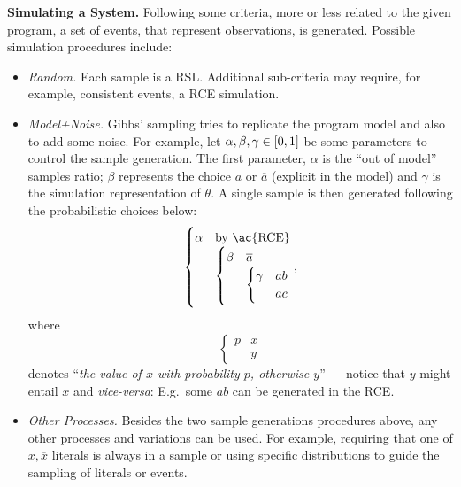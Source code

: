\documentclass{article}
\newcommand{\co}[1]{\ensuremath{\overline{#1}}}
\begin{document}
\bigskip\noindent\textbf{Simulating a System.} Following some
criteria, more or less related to the given program, a set of events,
that represent observations, is generated.  Possible simulation
procedures include:
\begin{itemize}

\item \emph{Random.} Each sample is a \ac{RSL}.  Additional
  sub-criteria may require, for example, consistent events, a \ac{RCE}
  simulation.

\item \emph{Model+Noise.} Gibbs' sampling \cite{geman84} tries to
  replicate the program model and also to add some noise.  For
  example, let $\alpha, \beta, \gamma \in \intcc{0,1}$ be some
  parameters to control the sample generation.  The first parameter,
  $\alpha$ is the ``out of model'' samples ratio; $\beta$ represents
  the choice $a$ or $\co{a}$ (explicit in the model) and $\gamma$ is
  the simulation representation of $\theta$.  A single sample is then
  generated following the probabilistic choices below:
  $$
  \begin{cases}
	\alpha & \text{by \ac{RCE}} \\%
		   &
			 \begin{cases}
			   \beta & \co{a} \\%
					 &
					   \begin{cases}
						 \gamma & ab \\%
								& ac
					   \end{cases}
			 \end{cases}
  \end{cases},
  $$
  where
  $$
  \begin{cases}
	p & x \\%
	  & y
  \end{cases}
  $$
  denotes ``\emph{the value of $x$ with probability $p$, otherwise
	$y$}'' --- notice that $y$ might entail $x$ and \emph{vice-versa}:
  E.g.\ some $ab$ can be generated in the \ac{RCE}.

\item \emph{Other Processes.} Besides the two sample generations
  procedures above, any other processes and variations can be used.
  For example, requiring that one of $x, \co{x}$ literals is always in
  a sample or using specific distributions to guide the sampling of
  literals or events.

\end{itemize}
\end{document}

